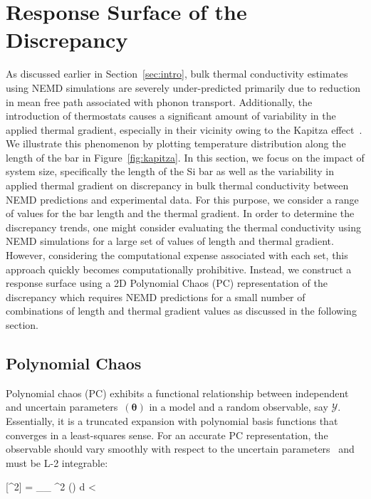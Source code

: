 \section{Response Surface of the Discrepancy}
\label{sec:response}

As discussed earlier in Section~\ref{sec:intro}, bulk thermal conductivity estimates using NEMD simulations
are severely under-predicted primarily due to reduction in mean free path associated with phonon transport. 
Additionally, the introduction of thermostats causes a significant amount of variability in the applied thermal gradient,
especially in their vicinity owing to the Kapitza effect~\cite{Stevens:2007}. 
We illustrate this phenomenon by plotting temperature 
distribution along the length of the bar in Figure~\ref{fig:kapitza}. In this section, we focus on the impact of
system size, specifically the length of the Si bar as well as the variability in applied thermal gradient on discrepancy
in bulk thermal conductivity between NEMD predictions and experimental data. For this purpose, we consider
a range of values for the bar length and the thermal gradient. In order to determine the discrepancy trends, one
might consider evaluating the thermal conductivity using NEMD simulations for a large set of values of length and
thermal gradient. However, considering the computational expense associated with each set, this approach quickly
becomes computationally prohibitive. Instead, we construct a response surface using a 2D
Polynomial Chaos (PC) representation of the discrepancy which requires NEMD predictions for a small number of
combinations of length and thermal gradient values as discussed in the following section. 

\subsection{Polynomial Chaos}

Polynomial chaos (PC) exhibits a functional relationship between independent and uncertain 
parameters~$(\bm{\theta})$ 
in a model and a random observable, say $\mathcal{Y}$. Essentially, it is a truncated expansion with polynomial 
basis functions that converges in a least-squares sense. For an accurate PC representation, the observable should
vary smoothly with respect to the uncertain parameters~\cite{Vohra:2014}  and must
be L-2 integrable:

\be
{}[^2] = \int_{_{\bm{\theta}}} ^2 (\bm{\theta}) 
d\bm{\theta} < \infty
\ee

